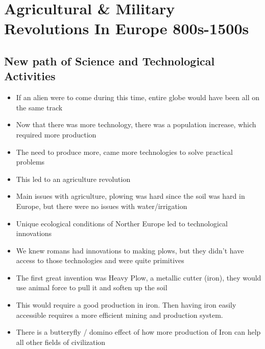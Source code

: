 \documentclass{article}
\begin{document}
\newpage

\section{Agricultural \& Military Revolutions In Europe 800s-1500s}
\subsection{New path of Science and Technological Activities}
\begin{itemize}
  \item If an alien were to come during this time, entire globe would have been
    all on the same track
  \item Now that there was more technology, there was a population increase,
    which required more production
  \item The need to produce more, came more technologies to solve practical problems
  \item This led to an agriculture revolution
  \item Main issues with agriculture, plowing was hard since the soil was hard in Europe,
    but there were no issues with water/irrigation
  \item Unique ecological conditions of Norther Europe led to technological innovations
  \item We knew romans had innovations to making plows, but they
    didn't have access to those technologies and were quite
    primitives
  \item The first great invention was Heavy Plow, a metallic cutter (iron),
    they would use animal force to pull it and soften up the soil
  \item This would require a good production in iron. Then having iron easily accessible requires
    a more efficient mining and production system.
  \item There is a butteryfly / domino effect of how more production of Iron can help all other fields
    of civilization

\end{itemize}
\end{document}
